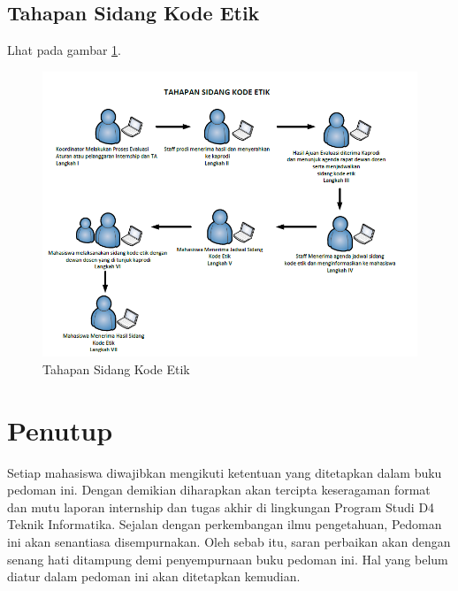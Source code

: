 \section{Tahapan Sidang Kode Etik}
Lhat pada gambar \ref{figure:P5}.
\begin{figure}[ht]
	\centerline{\includegraphics[width=1\textwidth]{figures/kode.png}}
	\caption{Tahapan Sidang Kode Etik}
	\label{figure:P5}
	\end{figure}
	
\chapter{Penutup}

Setiap mahasiswa  diwajibkan mengikuti ketentuan yang ditetapkan dalam buku pedoman ini. Dengan demikian diharapkan akan tercipta keseragaman format dan mutu laporan internship dan tugas akhir di lingkungan Program Studi D4 Teknik Informatika. Sejalan dengan perkembangan ilmu pengetahuan, Pedoman ini akan senantiasa disempurnakan. Oleh sebab itu, saran perbaikan akan dengan senang hati ditampung demi penyempurnaan buku pedoman ini. Hal yang belum diatur dalam pedoman ini akan ditetapkan kemudian.